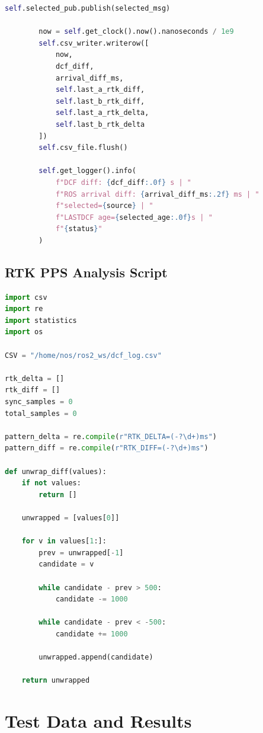 \begin{lstlisting}[style=codeStyle, language=Python, caption={ROS2 comparison node for evaluating two synchronization streams.}, label={lst:rosCompareNode}]
        self.selected_pub.publish(selected_msg)

        now = self.get_clock().now().nanoseconds / 1e9
        self.csv_writer.writerow([
            now,
            dcf_diff,
            arrival_diff_ms,
            self.last_a_rtk_diff,
            self.last_b_rtk_diff,
            self.last_a_rtk_delta,
            self.last_b_rtk_delta
        ])
        self.csv_file.flush()

        self.get_logger().info(
            f"DCF diff: {dcf_diff:.0f} s | "
            f"ROS arrival diff: {arrival_diff_ms:.2f} ms | "
            f"selected={source} | "
            f"LASTDCF age={selected_age:.0f}s | "
            f"{status}"
        )
\end{lstlisting}

\section{RTK PPS Analysis Script}
\label{app:rtkAnalysis}

\begin{lstlisting}[style=codeStyle, language=Python, caption={Python script for analyzing RTK PPS period and RTK difference statistics.}, label={lst:rtkAnalysis}]
import csv
import re
import statistics
import os

CSV = "/home/nos/ros2_ws/dcf_log.csv"

rtk_delta = []
rtk_diff = []
sync_samples = 0
total_samples = 0

pattern_delta = re.compile(r"RTK_DELTA=(-?\d+)ms")
pattern_diff = re.compile(r"RTK_DIFF=(-?\d+)ms")

def unwrap_diff(values):
    if not values:
        return []

    unwrapped = [values[0]]

    for v in values[1:]:
        prev = unwrapped[-1]
        candidate = v

        while candidate - prev > 500:
            candidate -= 1000

        while candidate - prev < -500:
            candidate += 1000

        unwrapped.append(candidate)

    return unwrapped
\end{lstlisting}
\chapter{Test Data and Results}
\label{app:testData}

